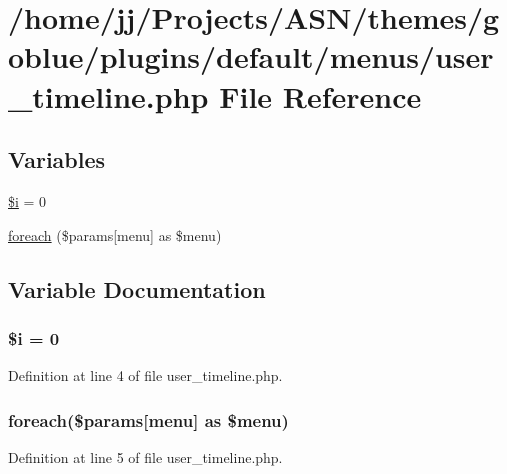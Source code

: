 \hypertarget{user__timeline_8php}{}\section{/home/jj/\+Projects/\+A\+S\+N/themes/goblue/plugins/default/menus/user\+\_\+timeline.php File Reference}
\label{user__timeline_8php}
\subsection*{Variables}
\begin{DoxyCompactItemize}
\item 
\hyperlink{user__timeline_8php_a83018d9153d17d91fbcf3bc10158d34f}{\$i} = 0
\item 
\hyperlink{user__timeline_8php_a1b18c909b5f0affc85267f294d947c4b}{foreach} (\$params\mbox{[}\textquotesingle{}menu\textquotesingle{}\mbox{]} as \$menu)
\end{DoxyCompactItemize}


\subsection{Variable Documentation}
\subsubsection[{\texorpdfstring{\$i}{$i}}]{\setlength{\rightskip}{0pt plus 5cm}\${\bf i} = 0}\hypertarget{user__timeline_8php_a83018d9153d17d91fbcf3bc10158d34f}{}\label{user__timeline_8php_a83018d9153d17d91fbcf3bc10158d34f}


Definition at line 4 of file user\+\_\+timeline.\+php.

\subsubsection[{\texorpdfstring{foreach}{foreach}}]{\setlength{\rightskip}{0pt plus 5cm}foreach(\$params\mbox{[}\textquotesingle{}menu\textquotesingle{}\mbox{]} as \$menu)}\hypertarget{user__timeline_8php_a1b18c909b5f0affc85267f294d947c4b}{}\label{user__timeline_8php_a1b18c909b5f0affc85267f294d947c4b}


Definition at line 5 of file user\+\_\+timeline.\+php.

